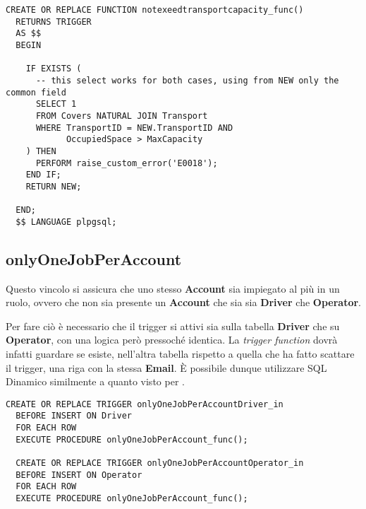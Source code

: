 \begin{lstlisting}[caption={Funzione per il vincolo \textbf{checkTransportCapacity}}]
  CREATE OR REPLACE FUNCTION notexeedtransportcapacity_func()
  RETURNS TRIGGER
  AS $$
  BEGIN
     
    IF EXISTS (
      -- this select works for both cases, using from NEW only the common field
      SELECT 1
      FROM Covers NATURAL JOIN Transport
      WHERE TransportID = NEW.TransportID AND
            OccupiedSpace > MaxCapacity
    ) THEN
      PERFORM raise_custom_error('E0018');
    END IF;
    RETURN NEW;

  END;
  $$ LANGUAGE plpgsql;
\end{lstlisting}

\newpage

\subsection{\textbf{onlyOneJobPerAccount}}

Questo vincolo si assicura che uno stesso \textbf{Account} sia impiegato al più in un ruolo, ovvero che non sia presente un \textbf{Account} che sia sia \textbf{Driver} che \textbf{Operator}.

Per fare ciò è necessario che il trigger si attivi sia sulla tabella \textbf{Driver} che su \textbf{Operator}, con una logica però pressoché identica. La \textit{trigger function} dovrà infatti guardare se esiste, nell'altra tabella rispetto a quella che ha fatto scattare il trigger, una riga con la stessa \textbf{Email}.
È possibile dunque utilizzare SQL Dinamico similmente a quanto visto per .

\begin{lstlisting}[caption={Trigger per il vincolo \textbf{onlyOneJobPerAccount}}]
  CREATE OR REPLACE TRIGGER onlyOneJobPerAccountDriver_in
  BEFORE INSERT ON Driver
  FOR EACH ROW
  EXECUTE PROCEDURE onlyOneJobPerAccount_func();

  CREATE OR REPLACE TRIGGER onlyOneJobPerAccountOperator_in
  BEFORE INSERT ON Operator
  FOR EACH ROW
  EXECUTE PROCEDURE onlyOneJobPerAccount_func();
\end{lstlisting}

